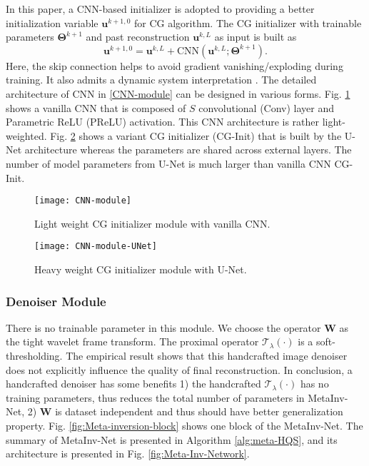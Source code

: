 \documentclass[journal,twoside]{IEEEtran}
\begin{document}
In this paper, a CNN-based initializer is adopted to providing a better initialization variable $\bm{u}^{k+1,0}$ for CG algorithm. The CG initializer with trainable parameters $\bm{\Theta}^{k+1}$ and past reconstruction $\bm{u}^{k,L}$ as input is built as
\begin{equation}\label{CNN-module}
\bm{u}^{k+1,0}=\bm{u}^{k,L}+\mbox{CNN}(\bm{u}^{k,L};\bm{\Theta}^{k+1}).
\end{equation}
Here, the skip connection helps to avoid gradient vanishing/exploding during training. It also admits a dynamic system interpretation \cite{lu18beyond,weinan2017proposal,chen2018neural}. The detailed architecture of CNN in \eqref{CNN-module} can be designed in various forms. Fig. \ref{fig:CG-init-CNN} shows a vanilla CNN that is composed of $S$ convolutional (Conv) layer and Parametric ReLU (PReLU) activation. This CNN architecture is rather light-weighted. Fig. \ref{fig:CG-init-CNN-H} shows a variant CG initializer (CG-Init) that is built by the U-Net architecture \cite{Ronneberger2015U-net} whereas the parameters are shared across  external layers. The number of model parameters from U-Net is much larger than vanilla CNN CG-Init.

\begin{figure}[t]
\centering
\texttt{[image: CNN-module]}
  \caption{Light weight CG initializer module with vanilla CNN.}
  \label{fig:CG-init-CNN}
\end{figure}


\begin{figure}[t]
  \centering
  \texttt{[image: CNN-module-UNet]}
  \caption{Heavy weight CG initializer module with U-Net.}
  \label{fig:CG-init-CNN-H}
\end{figure}


\subsubsection{Denoiser Module}
There is no trainable parameter in this module. We choose the operator $\bm{W}$ as the tight wavelet frame transform. The proximal operator $\mathcal{T}_{\lambda}(\cdot)$ is a soft-thresholding. The empirical result shows that this handcrafted image denoiser does not explicitly influence the quality of final reconstruction. In conclusion, a handcrafted denoiser has some benefits 1) the handcrafted $\mathcal{T}_{\lambda}(\cdot)$ has no training parameters, thus reduces the total number of parameters in MetaInv-Net, 2) $\bm{W}$ is dataset independent and thus should have better generalization property. Fig. \ref{fig:Meta-inversion-block} shows one block of the MetaInv-Net. The summary of MetaInv-Net is presented in Algorithm \ref{alg:meta-HQS}, and its architecture is presented in Fig. \ref{fig:Meta-Inv-Network}.
\end{document}
